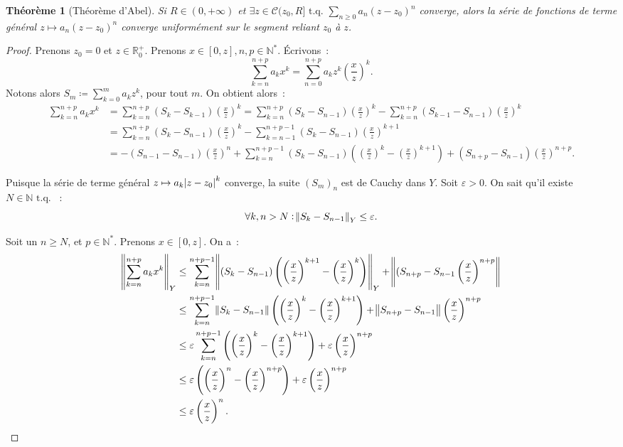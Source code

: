 \documentclass{report}
\newtheorem{thm}{Théorème}[chapter]
\theoremstyle{definition}
\theoremstyle{remark}
\numberwithin{equation}{section}
\newcommand{\R}{\mathbb R}
\newcommand{\Rp}{\R^{+}}
\newcommand{\N}{\mathbb N}
\newcommand{\Ns}{\N^{*}}
\newcommand{\tq}{\text{ t.q. }}
\newcommand{\pinfty}{{+\infty}}
\begin{document}
			\begin{thm}[Théorème d'Abel]\label{thm:cvgsurcercleimpliquecvusursegment} Si $R \in (0, \pinfty)$ et
			$\exists z \in \mathcal C(z_0, R] \tq \sum_{n \geq 0} a_n(z - z_0)^n$ converge, alors la série de fonctions de terme général
			$z \mapsto a_n(z - z_0)^n$ converge uniformément sur le segment reliant $z_0$ à $z$.
			\end{thm}

			\begin{proof} Prenons $z_0 = 0$ et $z \in \Rp_0$. Prenons $x \in [0, z], n, p \in \Ns$. Écrivons~:
			\begin{equation}
				\sum_{k=n}^{n+p}a_kx^k = \sum_{n=0}^{n+p}a_kz^k\left(\frac xz\right)^k.
			\end{equation}
			Notons alors $S_m \coloneqq \sum_{k=0}^ma_kz^k$, pour tout $m$. On obtient alors~:
			\begin{align}
				\sum_{k=n}^{n+p}a_kx^k &= \sum_{k=n}^{n+p}(S_k - S_{k-1})\left(\frac xz\right)^k
					= \sum_{k=n}^{n+p}(S_k - S_{n-1})\left(\frac xz\right)^k - \sum_{k=n}^{n+p}(S_{k-1} - S_{n-1})\left(\frac xz\right)^k \\
				&= \sum_{k=n}^{n+p}(S_k-S_{n-1})\left(\frac xz\right)^k - \sum_{k=n-1}^{n+p-1}(S_k-S_{n-1})\left(\frac xz\right)^{k+1} \\
				&= -(S_{n-1}-S_{n-1})\left(\frac xz\right)^n + \sum_{k=n}^{n+p-1}(S_k-S_{n-1})\left(\left(\frac xz\right)^k - \left(\frac xz\right)^{k+1}\right)
					+ (S_{n+p}-S_{n-1})\left(\frac xz\right)^{n+p}.
			\end{align}

			Puisque la série de terme général $z \mapsto a_k\abs {z-z_0}^k$ converge, la suite $(S_m)_n$ est de Cauchy dans $Y$. Soit $\varepsilon > 0$. On sait
			qu'il existe $N \in \N \tq$~:
			\begin{equation}
				\forall k, n > N : \norm {S_k - S_{n-1}}_Y \leq \varepsilon.
			\end{equation}

			Soit un $n \geq N$, et $p \in \Ns$. Prenons $x \in [0, z]$. On a~:
			\begin{align}
				\norm {\sum_{k=n}^{n+p}a_kx^k}_Y &\leq \sum_{k=n}^{n+p-1}\norm {(S_k-S_{n-1})\left(\left(\frac xz\right)^{k+1} - \left(\frac xz\right)^k\right)}_Y
					+ \norm {(S_{n+p}-S_{n-1}\left(\frac xz\right)^{n+p}} \\
				&\leq \sum_{k=n}^{n+p-1}\norm {S_k - S_{n-1}}\left(\left(\frac xz\right)^k - \left(\frac xz\right)^{k+1}\right)
					+ \norm {S_{n+p}-S_{n-1}}\left(\frac xz\right)^{n+p} \\
				&\leq \varepsilon\sum_{k=n}^{n+p-1}\left(\left(\frac xz\right)^k - \left(\frac xz\right)^{k+1}\right) + \varepsilon\left(\frac xz\right)^{n+p} \\
				&\leq \varepsilon\left(\left(\frac xz\right)^n - \left(\frac xz\right)^{n+p}\right) + \varepsilon\left(\frac xz\right)^{n+p} \\
				&\leq \varepsilon\left(\frac xz\right)^{n}.
			\end{align}


\end{proof}
\end{document}
